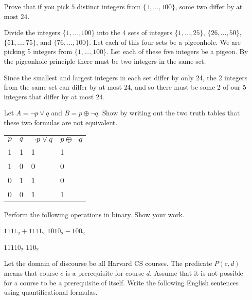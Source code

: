 \documentclass[solution, letterpaper]{cs20exam}
\begin{document}

\problem{}{} Prove that if you pick $5$ distinct integers from $\{1, \ldots, 100\}$, some two differ by at most $24$.

\begin{solution}
Divide the integers $\{1, \ldots, 100\}$ into the 4 sets of integers $\{1, \ldots, 25\}$, $\{26, \ldots, 50\}$, $\{51, \ldots, 75\}$, and $\{76, \ldots, 100\}$. Let each of this four sets be a pigeonhole. We are picking 5 integers from $\{1, \ldots, 100\}$. Let each of these five integers be a pigeon. By the pigeonhole principle there must be two integers in the same set.  

Since the smallest and largest integers in each set differ by only 24, the 2 integers from the same set can differ by at most 24, and so there must be some 2 of our 5 integers that differ by at most 24.
\end{solution}

\problem{}{} Let $A = \neg p \lor q$ and $B = p \oplus \neg q$. Show by writing out the two truth tables that these two formulas are not equivalent.

\begin{solution}
\begin{table}[h]
\centering
\label{my-label}
\begin{tabular}{llll}
$p$ & $q$ & $\neg p \lor q$ & $p \oplus \neg q$ \\
1   & 1   & 1               & 1                 \\
1   & 0   & 0               & 0                 \\
0   & 1   & 1               & 0                 \\
0   & 0   & 1               & 1                
\end{tabular}
\end{table}
\end{solution}

\problem{}{} Perform the following operations in binary. Show your work.

\subproblem $1111_2 + 1111_2$
\subproblem $1010_2 - 100_2$

\begin{solution}
\subsolution $11110_2$
\subsolution $110_2$
\end{solution}

\problem{}{} Let the domain of discourse be all Harvard CS courses. The predicate $P(c, d)$ means that course $c$ is a prerequisite for course $d$. Assume that it is not possible for a course to be a prerequisite of itself. Write the following English sentences using quantificational formulas.
\end{document}
